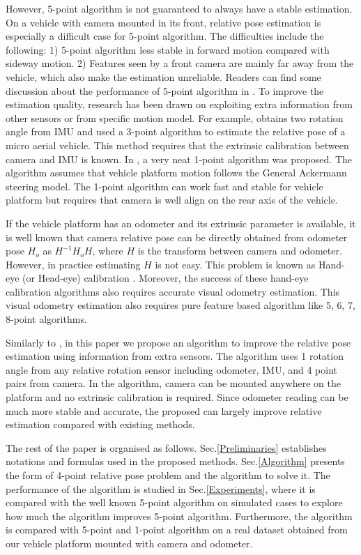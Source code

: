 \documentclass[letterpaper, 10 pt, conference]{ieeeconf}
\begin{document}
However, 5-point algorithm is not guaranteed to always have a stable estimation. On a vehicle with camera mounted in its front, relative pose estimation is especially a difficult case for 5-point algorithm. The difficulties include the following: 1) 5-point algorithm less stable in forward motion compared with sideway motion. 2) Features seen by a front camera are mainly far away from the vehicle, which also make the estimation unreliable. Readers can find some discussion about the performance of 5-point algorithm in \cite{nister2004efficient, stewenius2006recent}. To improve the estimation quality, research has been drawn on exploiting extra information from other sensors or from specific motion model. For example, \cite{fraundorfer2010minimal} obtains two rotation angle from IMU and used a 3-point algorithm to estimate the relative pose of a micro aerial vehicle. This method requires that the extrinsic calibration between camera and IMU is known. In \cite{scaramuzza20111}, a very neat 1-point algorithm was proposed. The algorithm assumes that vehicle platform motion follows the General Ackermann steering model. The 1-point algorithm can work fast and stable for vehicle platform but requires that camera is well align on the rear axis of the vehicle. 

If the vehicle platform has an odometer and its extrinsic parameter is available, it is well known that camera relative pose can be directly obtained from odometer pose $H_o$ as $H^{-1} H_o H$, where $H$ is the transform between camera and odometer. However, in practice estimating $H$ is not easy. This problem is known as Hand-eye (or Head-eye) calibration \cite{tsai1989new, shiu1989calibration}. Moreover, the success of these hand-eye calibration algorithms also requires accurate visual odometry estimation. This visual odometry estimation also requires pure feature based algorithm like 5, 6, 7, 8-point algorithms. 

Similarly to \cite{fraundorfer2010minimal, scaramuzza20111}, in this paper we propose an algorithm to improve the relative pose estimation using information from extra sensors. The algorithm uses 1 rotation angle from any relative rotation sensor including odometer, IMU, and 4 point pairs from camera. In the algorithm, camera can be mounted anywhere on the platform and no extrinsic calibration is required. Since odometer reading can be much more stable and accurate, the proposed can largely improve relative estimation compared with existing methods. 

The rest of the paper is organised as follows. Sec.\ref{Preliminaries} establishes notations and formulas used in the proposed methods. Sec.\ref{Algorithm} presents the form of 4-point relative pose problem and the algorithm to solve it. The performance of the algorithm is studied in Sec.\ref{Experiments}, where it is compared with the well known 5-point algorithm on simulated cases to explore how much the algorithm improves 5-point algorithm. Furthermore, the algorithm is compared with 5-point and 1-point algorithm on a real dataset obtained from our vehicle platform mounted with camera and odometer. 
\end{document}
